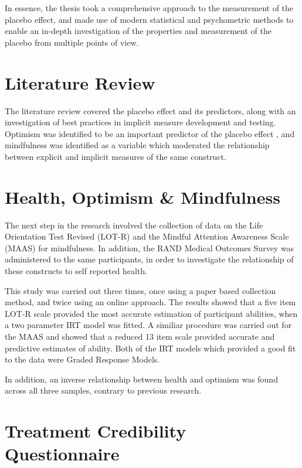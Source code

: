 \documentclass{article}
\begin{document}
In essence, the thesis took a comprehensive approach to the measurement of the placebo effect, and made use of modern statistical and psychometric methods to enable an in-depth investigation of the properties and measurement of the placebo from multiple points of view. 


\section{Literature Review}
\label{sec:literature-review}

The literature review covered the placebo effect and its predictors, along with an investigation of best practices in implicit measure development and testing. Optimism was identified to be an important predictor of the placebo effect \citep{Geers2005}, and mindfulness was identified as a variable which moderated the relationship between explicit and implicit measures of the same construct. 

\section{Health, Optimism \& Mindfulness}
\label{sec:health-optimism-}

The next step in the research involved the collection of data on the Life Orientation Test Revised (LOT-R) and the Mindful Attention Awareness Scale (MAAS) for mindfulness. In addition, the RAND Medical Outcomes Survey was administered to the same participants, in order to investigate the relationship of these constructs to self reported health. 

This study was carried out three times, once using a paper based collection method, and twice using an online approach. The results showed that a five item LOT-R scale provided the most accurate estimation of participant abilities, when a two parameter IRT model was fitted. A similiar procedure was carried out for the MAAS and showed that a reduced 13 item scale provided accurate and predictive estimates of ability. Both of the IRT models which provided a good fit to the data were Graded Response Models. 

In addition, an inverse relationship between health and optimism was found across all three samples, contrary to previous research. 

\section{Treatment Credibility Questionnaire}
\label{sec:treatm-cred-quest}
\end{document}
